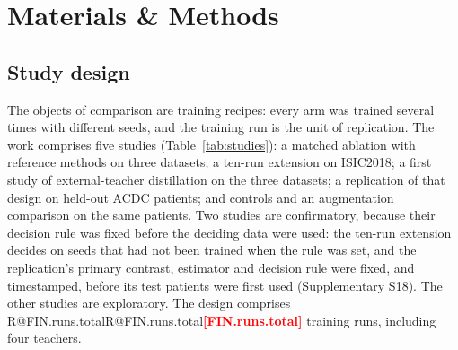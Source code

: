 \documentclass[fleqn,10pt,lineno]{wlpeerj}
\makeatletter
\newcommand{\R}[1]{\ifcsname R@#1\endcsname\csname R@#1\endcsname\else\textbf{\textcolor{red}{[#1]}}\fi}
\makeatother
\begin{document}
\section*{Materials \& Methods}

\subsection*{Study design}
The objects of comparison are training recipes: every arm was trained several times with different seeds, and the training run is the unit of replication. The work comprises five studies (Table~\ref{tab:studies}): a matched ablation with reference methods on three datasets; a ten-run extension on ISIC2018; a first study of external-teacher distillation on the three datasets; a replication of that design on held-out ACDC patients; and controls and an augmentation comparison on the same patients. Two studies are confirmatory, because their decision rule was fixed before the deciding data were used: the ten-run extension decides on seeds that had not been trained when the rule was set, and the replication's primary contrast, estimator and decision rule were fixed, and timestamped, before its test patients were first used (Supplementary S18). The other studies are exploratory. The design comprises \R{FIN.runs.total} training runs, including four teachers.

\begin{table}[!tb]
\centering
\begin{threeparttable}

\caption{\label{tab:studies}Studies, runs and test data. Confirmatory: the decision rule was fixed before the deciding runs (study 2, fresh seeds) or test patients (study 4) were used. Arm abbreviations: Table~\ref{tab:arms}. Protocols: Supplementary S13, S15, S17, S18, S21.}
\end{threeparttable}
\end{table}
\end{document}
